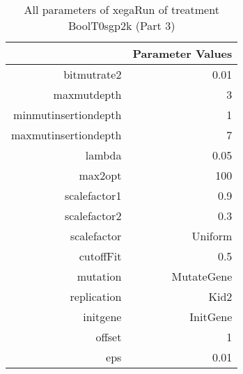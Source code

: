 \begin{table}[ht]
\centering
\begin{tabular}{rr}
  \hline
 & Parameter Values \\ 
  \hline
bitmutrate2 & 0.01 \\ 
  maxmutdepth & 3 \\ 
  minmutinsertiondepth & 1 \\ 
  maxmutinsertiondepth & 7 \\ 
  lambda & 0.05 \\ 
  max2opt & 100 \\ 
  scalefactor1 & 0.9 \\ 
  scalefactor2 & 0.3 \\ 
  scalefactor & Uniform \\ 
  cutoffFit & 0.5 \\ 
  mutation & MutateGene \\ 
  replication & Kid2 \\ 
  initgene & InitGene \\ 
  offset & 1 \\ 
  eps & 0.01 \\ 
   \hline
\end{tabular}
\caption{ All parameters of xegaRun of treatment BoolT0sgp2k 
 (Part 3)} 
\end{table}
